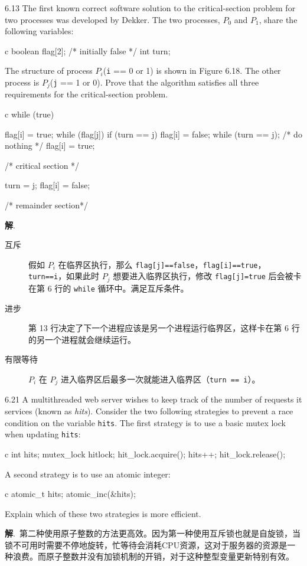 \documentclass[12pt,a4paper]{article}
\newenvironment{problems}{\begin{list}{}{\renewcommand{\makelabel}[1]{\textbf{##1}\hfil}}}{\end{list}}
\providecommand{\sol}{\textbf{解}.~}
\begin{document}
\begin{problems}
    \item[6.13] The first known correct software solution to the critical-section problem for two processes was developed by Dekker. The two processes, $P_0$ and $P_1$, share the following variables:
    \begin{code}{c}
        boolean flag[2]; /* initially false */
        int turn;
    \end{code} 
    The structure of process $P_i$(\verb"i" == 0 or 1) is shown in Figure 6.18. The other process is $P_j$(\verb"j" == 1 or 0). Prove that the algorithm satisfies all three requirements for the critical-section problem.
    \begin{code}{c}
        while (true){
            flag[i] = true;
            while (flag[j]){
                if (turn == j){
                    flag[i] = false;
                    while (turn == j); /* do nothing */
                    flag[i] = true;
                }
            }
                
                /* critical section */
                
            turn = j;
            flag[i] = false;
                
                /* remainder section*/
        }
    \end{code}

    \sol \begin{description}
        \item[互斥] 假如 $P_i$ 在临界区执行，那么 \verb"flag[j]==false"，\verb"flag[i]==true"，\verb"turn==i"，如果此时 $P_j$ 想要进入临界区执行，修改 \verb"flag[j]=true" 后会被卡在第 6 行的 \verb"while" 循环中。满足互斥条件。
        \item[进步] 第 13 行决定了下一个进程应该是另一个进程运行临界区，这样卡在第 6 行的另一个进程就会继续运行。
        \item[有限等待] $P_i$ 在 $P_j$ 进入临界区后最多一次就能进入临界区（\verb"turn == i"）。
    \end{description}

    \item[6.21] A multithreaded web server wishes to keep track of the number of requests it services (known as \emph{hits}). Consider the two following strategies to prevent a race condition on the variable \verb"hits". The first strategy is to use a basic mutex lock when updating \verb"hits":
    \begin{code}{c}
        int hits;
        mutex_lock hitlock;
        hit_lock.acquire();
        hits++;
        hit_lock.release();
    \end{code} 
    A second strategy is to use an atomic integer:
    \begin{code}{c}
        atomic_t hits;
        atomic_inc(&hits);
    \end{code}
    Explain which of these two strategies is more efficient.

    \sol 第二种使用原子整数的方法更高效。因为第一种使用互斥锁也就是自旋锁，当锁不可用时需要不停地旋转，忙等待会消耗CPU资源，这对于服务器的资源是一种浪费。而原子整数并没有加锁机制的开销，对于这种整型变量更新特别有效。

\end{problems}
\end{document}

